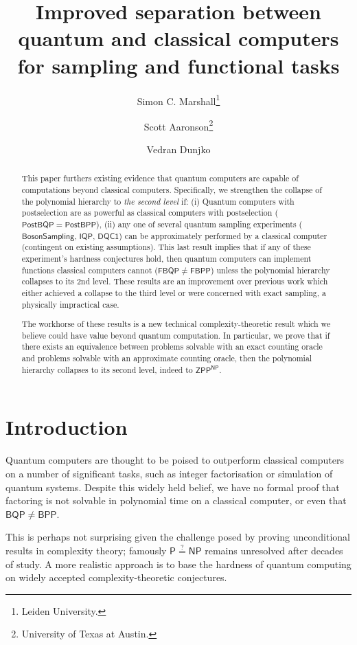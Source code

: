 \documentclass{article}
\title{
Improved separation between quantum and classical computers for sampling and functional tasks
}
\author{
Simon C. Marshall\thanks{Leiden University.}
\and
Scott Aaronson\thanks{University of Texas at Austin.}
\and
Vedran Dunjko\footnotemark[1]
}
\date{}
\begin{document}
\maketitle
\begin{abstract}
This paper furthers existing evidence that quantum computers are capable of computations beyond classical computers.
Specifically, we strengthen the collapse of the polynomial hierarchy to \textit{the second level} if: (i) Quantum computers with postselection are as powerful as classical computers with postselection ($\mathsf{PostBQP=PostBPP}$), 
(ii) any one of several quantum sampling experiments ($\mathsf{BosonSampling}$, $\mathsf{IQP}$, $\mathsf{DQC1}$) can be approximately performed by a classical computer (contingent on existing assumptions).
This last result implies that if any of these experiment's hardness conjectures hold, then quantum computers can implement functions classical computers cannot ($\mathsf{FBQP\neq FBPP}$) unless the polynomial hierarchy collapses to its 2nd level. These results are an improvement over previous work which either achieved a collapse to the third level or were concerned with exact sampling, a physically impractical case.

The workhorse of these results is a new technical complexity-theoretic result which we believe could have value beyond quantum computation. In particular, we prove that if there exists an equivalence between problems solvable with an exact counting oracle and problems solvable with an approximate counting oracle, then the polynomial hierarchy collapses to its second level, indeed to $\mathsf{ZPP^{NP}}$.
\end{abstract}

\maketitle
\section{Introduction}
Quantum computers are thought to be poised to outperform classical computers on a number of significant tasks, such as integer factorisation or simulation of quantum systems. Despite this widely held belief, we have no formal proof that factoring is not solvable in polynomial time on a classical computer, or even that $\mathsf{BQP\neq BPP}$.

This is perhaps not surprising given the challenge posed by proving unconditional results in complexity theory; famously $\mathsf{P\stackrel{?}{=}NP}$ remains unresolved after decades of study. A more realistic approach is to base the hardness of quantum computing on widely accepted complexity-theoretic conjectures.
\end{document}
